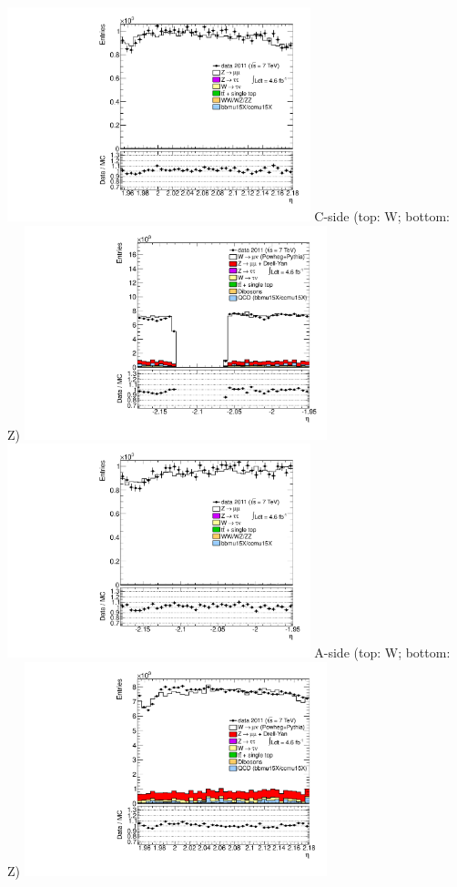 {\includegraphics[width=0.66\textwidth]{dates/20130306/figures/both/Z_10_A_stack_lN_eta_ALL.pdf} 
\cole
}
 {
\colb[T]
C-side (top: W; bottom: Z)
\centering
\includegraphics[width=0.66\textwidth]{dates/20130306/figures/wfix/WFIX_10_C_stack_l_eta_NEG} \\
\includegraphics[width=0.66\textwidth]{dates/20130306/figures/both/Z_10_C_stack_lN_eta_ALL.pdf}
A-side (top: W; bottom: Z)
\centering
\includegraphics[width=0.66\textwidth]{dates/20130306/figures/wfix/WFIX_10_A_stack_l_eta_NEG} \\
}
